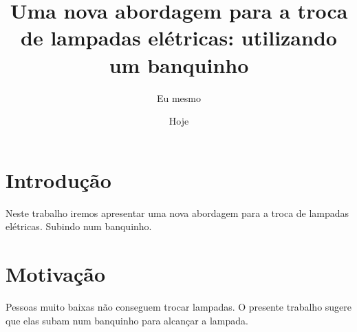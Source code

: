 \documentclass{article}
\author{Eu mesmo}
\date{Hoje}
\title{Uma nova abordagem para a troca de
       lampadas elétricas: utilizando um banquinho}
\begin{document}
\maketitle

\newpage

\section{Introdução}

Neste trabalho  iremos apresentar uma nova abordagem
para a troca  de lampadas elétricas.
Subindo  num  banquinho. %


\section{Motivação}

Pessoas muito baixas não conseguem trocar lampadas.
O presente trabalho sugere que elas subam num
banquinho para alcançar a lampada.
\end{document}
